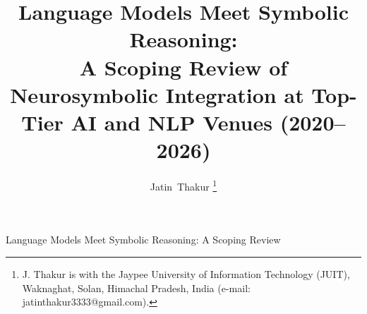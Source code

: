 \documentclass[journal]{IEEEtran}
\newif\ifanonymous \anonymousfalse
\begin{document}
\title{Language Models Meet Symbolic Reasoning:\\
A Scoping Review of Neurosymbolic Integration at Top-Tier AI and NLP Venues (2020--2026)}

\ifanonymous
\author{Anonymous Authors}
\else
\author{Jatin~Thakur%
\thanks{J. Thakur is with the Jaypee University of Information Technology (JUIT), Waknaghat, Solan, Himachal Pradesh, India (e-mail: jatinthakur3333@gmail.com).}}
\fi
{}%
{Language Models Meet Symbolic Reasoning: A Scoping Review}

\maketitle














\appendices




\end{document}
